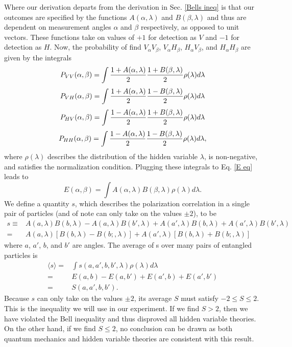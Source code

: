 \documentclass[11pt,letterpaper]{article}
\begin{document}
Where our derivation departs from the derivation in Sec. \ref{Bells ineq} is that our outcomes are specified by the functions $A(\alpha, \lambda)$ and $B(\beta, \lambda)$ and thus are dependent on measurement angles $\alpha$ and $\beta$ respectively, as opposed to unit vectors. These functions take on values of $+1$ for detection as $V$ and $-1$ for detection as $H$. Now, the probability of find $V_\alpha V_\beta$, $V_\alpha H_\beta$, $H_\alpha V_\beta$, and $H_\alpha H_\beta$ are given by the integrals
\begin{equation}
    P_{VV}(\alpha, \beta) = \int {1 + A(\alpha, \lambda) \over 2} {1 + B(\beta, \lambda) \over 2}\rho(\lambda)d\lambda
\end{equation}
\begin{equation}
    P_{VH}(\alpha, \beta) = \int {1 + A(\alpha, \lambda) \over 2} {1 - B(\beta, \lambda) \over 2}\rho(\lambda)d\lambda
\end{equation}
\begin{equation}
    P_{HV}(\alpha, \beta) = \int {1 - A(\alpha, \lambda) \over 2} {1 + B(\beta, \lambda) \over 2}\rho(\lambda)d\lambda
\end{equation}
\begin{equation}
    P_{HH}(\alpha, \beta) = \int {1 - A(\alpha, \lambda) \over 2} {1 - B(\beta, \lambda) \over 2}\rho(\lambda)d\lambda ,
\end{equation}
where $\rho(\lambda)$ describes the distribution of the hidden variable $\lambda$, is non-negative, and satisfies the normalization condition.
    Plugging these integrals to Eq. \ref{E eq} leads to
\begin{equation}
    E(\alpha, \beta) = \int A(\alpha, \lambda)B(\beta, \lambda) \rho(\lambda) d\lambda .
\end{equation}
We define a quantity $s$, which describes the polarization correlation in a single pair of particles (and of note can only take on the values $\pm 2$), to be
\begin{align}
    s \equiv & A(a, \lambda)B(b, \lambda) - A(a, \lambda)B(b', \lambda) + A(a', \lambda)B(b, \lambda) + A(a', \lambda)B(b', \lambda) \\
    = & A(a, \lambda)[B(b, \lambda) - B(b;, \lambda)] + A(a', \lambda)[B(b, \lambda) + B(b;, \lambda)]
\end{align}
where $a$, $a'$, $b$, and $b'$ are angles. The average of s over many pairs of entangled particles is
\begin{align}
    \langle s \rangle = & \int s(a, a', b, b', \lambda) \rho(\lambda) d\lambda \\
    = & E(a, b) - E(a, b') +E(a', b) + E(a', b') \\
    = & S(a, a', b, b') .
\end{align}
Because $s$ can only take on the values $\pm 2$, its average $S$ must satisfy $-2 \leq S \leq 2$. This is the inequality we will use in our experiment. If we find $S > 2$, then we have violated the Bell inequality and thus disproved all hidden variable theories. On the other hand, if we find $S \leq 2$, no conclusion can be drawn as both quantum mechanics and hidden variable theories are consistent with this result.
\end{document}
